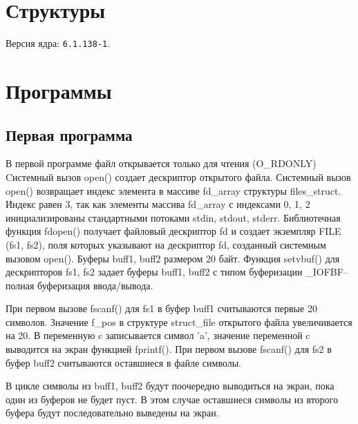 \chapter{Структуры}

Версия ядра: \texttt{6.1.138-1}.



\chapter{Программы}

\section{Первая программа}



В первой программе файл открывается только для чтения (O\_RDONLY)
Cистемный вызов open() создает дескриптор открытого файла.
Системный вызов open() возвращает индекс элемента в массиве fd\_array структуры files\_struct.
Индекс равен 3, так как элементы массива fd\_array с индексами 0, 1, 2 инициализированы стандартными потоками stdin, stdout, stderr.
Библиотечная функция fdopen() получает файловый дескриптор fd и создает экземпляр FILE (fs1, fs2), поля которых указывают на дескриптор fd, созданный системным вызовом open().
Буферы buff1, buff2 размером 20 байт.
Функция setvbuf() для дескрипторов fs1, fs2 задает буферы buff1, buff2 с типом буферизации \_IOFBF--полная буферизация ввода/вывода.

При первом вызове fscanf() для fs1 в буфер buff1 считываются первые 20 символов.
Значение f\_pos в структуре struct\_file открытого файла увеличивается на 20.
В переменную c записывается символ 'a', значение переменной c выводится на экран функцией fprintf().
При первом вызове fscanf() для fs2 в буфер buff2 считываются оставшиеся в файле символы.
 
В цикле символы из buff1, buff2 будут поочередно выводиться на экран, пока один из буферов не будет пуст.
В этом случае оставшиеся символы из второго буфера будут последовательно выведены на экран.


